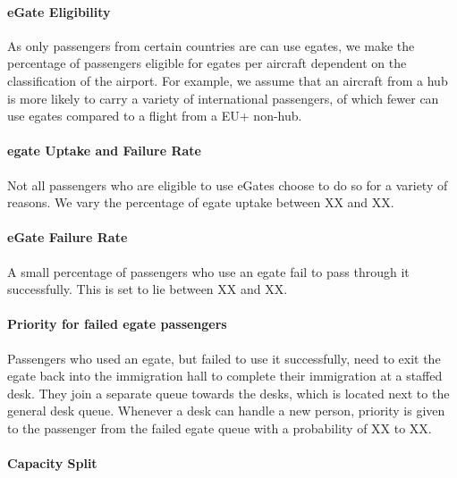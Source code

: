 \documentclass[10pt]{article}
\begin{document}
\paragraph{eGate Eligibility} 
As only passengers from certain countries are can use \glspl{egate}, we make the percentage of passengers eligible for \glspl{egate} per aircraft dependent on the classification of the airport. For example, we assume that an aircraft from a hub is more likely to carry a variety of international passengers, of which fewer can use \glspl{egate} compared to a flight from a EU+ non-hub. 

\paragraph{\gls{egate} Uptake and Failure Rate} 
Not all passengers who are eligible to use eGates choose to do so for a variety of reasons. We vary the percentage of \gls{egate} uptake between XX and XX.  

\paragraph{eGate Failure Rate}
A small percentage of passengers who use an \gls{egate} fail to pass through it successfully. This is set to lie between XX and XX.  

\paragraph{Priority for failed \gls{egate} passengers}
Passengers who used an \gls{egate}, but failed to use it successfully, need to exit the \gls{egate} back into the immigration hall to complete their immigration at a staffed desk. They join a separate queue towards the desks, which is located next to the general desk queue. Whenever a desk can handle a new person, priority is given to the passenger from the failed \gls{egate} queue with a probability of XX to XX.

\paragraph{Capacity Split}
\end{document}
